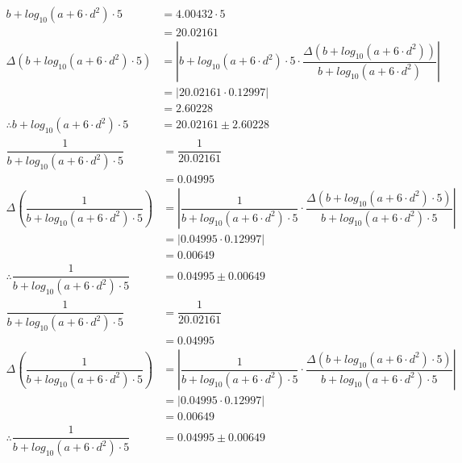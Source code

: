 \documentclass[a4paper]{article}
\begin{document}
\begin{align*}
b + log_{ 10 }\left( a + 6 \cdot d ^ { 2 } \right) \cdot 5 &= 4.00432 \cdot 5 \\
&= 20.02161 \\[4mm]
\Delta \left( b + log_{ 10 }\left( a + 6 \cdot d ^ { 2 } \right) \cdot 5 \right) &= \left| b + log_{ 10 }\left( a + 6 \cdot d ^ { 2 } \right) \cdot 5 \cdot \dfrac{ \Delta \left( b + log_{ 10 }\left( a + 6 \cdot d ^ { 2 } \right) \right) }{ b + log_{ 10 }\left( a + 6 \cdot d ^ { 2 } \right) } \right| \\
&= \left| 20.02161 \cdot 0.12997 \right| \\
&= 2.60228\\[4mm]
\therefore b + log_{ 10 }\left( a + 6 \cdot d ^ { 2 } \right) \cdot 5 &= 20.02161 \pm 2.60228
\end{align*}
\begin{align*}
\dfrac{ 1 }{ b + log_{ 10 }\left( a + 6 \cdot d ^ { 2 } \right) \cdot 5 } &= \dfrac{ 1 }{ 20.02161 } \\
&= 0.04995 \\[4mm]
\Delta \left( \dfrac{ 1 }{ b + log_{ 10 }\left( a + 6 \cdot d ^ { 2 } \right) \cdot 5 } \right) &= \left| \dfrac{ 1 }{ b + log_{ 10 }\left( a + 6 \cdot d ^ { 2 } \right) \cdot 5 } \cdot \dfrac{ \Delta \left( b + log_{ 10 }\left( a + 6 \cdot d ^ { 2 } \right) \cdot 5 \right) }{ b + log_{ 10 }\left( a + 6 \cdot d ^ { 2 } \right) \cdot 5 } \right| \\
&= \left| 0.04995 \cdot 0.12997 \right| \\
&= 0.00649\\[4mm]
\therefore \dfrac{ 1 }{ b + log_{ 10 }\left( a + 6 \cdot d ^ { 2 } \right) \cdot 5 } &= 0.04995 \pm 0.00649
\end{align*}
\begin{align*}
\dfrac{ 1 }{ b + log_{ 10 }\left( a + 6 \cdot d ^ { 2 } \right) \cdot 5 } &= \dfrac{ 1 }{ 20.02161 } \\
&= 0.04995 \\[4mm]
\Delta \left( \dfrac{ 1 }{ b + log_{ 10 }\left( a + 6 \cdot d ^ { 2 } \right) \cdot 5 } \right) &= \left| \dfrac{ 1 }{ b + log_{ 10 }\left( a + 6 \cdot d ^ { 2 } \right) \cdot 5 } \cdot \dfrac{ \Delta \left( b + log_{ 10 }\left( a + 6 \cdot d ^ { 2 } \right) \cdot 5 \right) }{ b + log_{ 10 }\left( a + 6 \cdot d ^ { 2 } \right) \cdot 5 } \right| \\
&= \left| 0.04995 \cdot 0.12997 \right| \\
&= 0.00649\\[4mm]
\therefore \dfrac{ 1 }{ b + log_{ 10 }\left( a + 6 \cdot d ^ { 2 } \right) \cdot 5 } &= 0.04995 \pm 0.00649
\end{align*}
\end{document}
